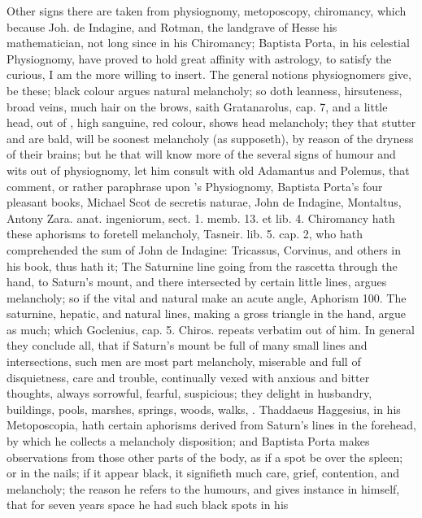 {{Other signs there are taken from physiognomy, metoposcopy, chiromancy,
which because Joh. de Indagine, and Rotman, the landgrave of Hesse his
mathematician, not long since in his Chiromancy; Baptista Porta, in his
celestial Physiognomy, have proved to hold great affinity with
astrology, to satisfy the curious, I am the more willing to insert.
The general notions physiognomers give, be these; black colour
argues natural melancholy; so doth leanness, hirsuteness, broad veins,
much hair on the brows, saith Gratanarolus, cap. 7, and a little
head, out of \Aristotle, high sanguine, red colour, shows head
melancholy; they that stutter and are bald, will be soonest melancholy (as \Avicenna{} supposeth), by reason of the dryness of their brains; but
he that will know more of the several signs of humour and wits out of
physiognomy, let him consult with old Adamantus and Polemus, that
comment, or rather paraphrase upon \Aristotle's Physiognomy, Baptista
Porta's four pleasant books, Michael Scot de secretis naturae, John de
Indagine, Montaltus, Antony Zara. anat. ingeniorum, sect. 1. memb. 13.
et lib. 4. Chiromancy hath these aphorisms to foretell melancholy, Tasneir. lib.
5. cap. 2, who hath comprehended the sum of John de Indagine:
Tricassus, Corvinus, and others in his book, thus hath it; The
Saturnine line going from the rascetta through the hand, to Saturn's
mount, and there intersected by certain little lines, argues
melancholy; so if the vital and natural make an acute angle, Aphorism
100. The saturnine, hepatic, and natural lines, making a gross triangle
in the hand, argue as much; which Goclenius, cap. 5. Chiros. repeats
verbatim out of him. In general they conclude all, that if Saturn's
mount be full of many small lines and intersections, such men are
most part melancholy, miserable and full of disquietness, care and
trouble, continually vexed with anxious and bitter thoughts, always
sorrowful, fearful, suspicious; they delight in husbandry, buildings,
pools, marshes, springs, woods, walks, \etc{}. Thaddaeus Haggesius, in his
Metoposcopia, hath certain aphorisms derived from Saturn's lines in the
forehead, by which he collects a melancholy disposition; and
Baptista Porta makes observations from those other parts of the
body, as if a spot be over the spleen; or in the nails; if it
appear black, it signifieth much care, grief, contention, and
melancholy; the reason he refers to the humours, and gives instance in
himself, that for seven years space he had such black spots in his
}}
